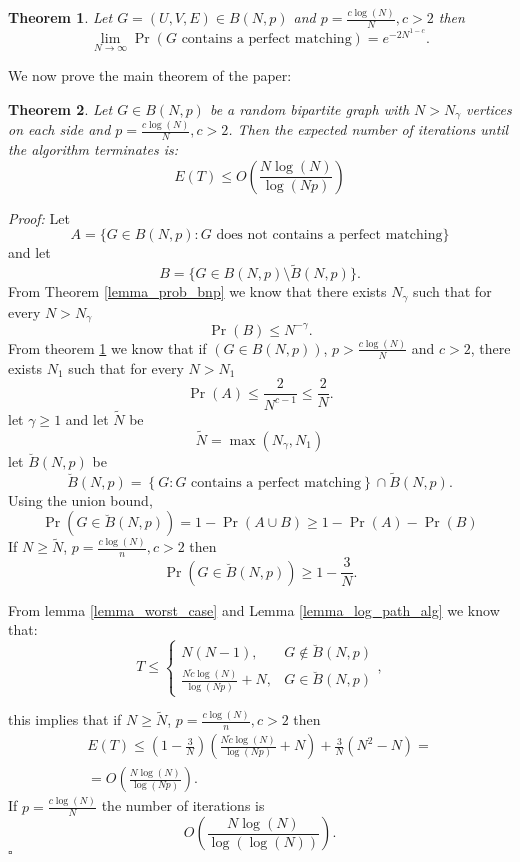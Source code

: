 \documentclass[11pt,onecolumn]{article}
\newcounter{theorem}
\newcommand{\beq}{\begin{equation}}
\newcommand{\eeq}{\end{equation}}
\newcommand{\bea}{\begin{array}}
\newcommand{\ena}{\end{array}}
\newenvironment{proof}{\textit{Proof:}}{\hfill$\square$\\}
\newtheorem{theorem}{Theorem}
\begin{document}
\begin{theorem} \label {theorem_prob_perfect}Let $G=(U,V,E)\in B(N,p)$ and $p=\frac{c\log(N)}{N}, c>2$ then
\beq
\lim_{N\to\infty}\Pr\left(G \textrm{ contains a perfect matching}\right)=e^{-2N^{1-c}}.
\eeq
\end{theorem}
We now prove the main theorem of the paper:
\begin{theorem}\label{theorem_N_iter} Let $G\in B(N,p)$ be a random bipartite graph with $N>N_{\gamma}$ vertices on each side and $p=\frac{c\log(N)}{N},c>2$. Then the expected number of iterations until the algorithm terminates is:
\beq
E(T)\leq O\left(\frac{N\log(N)}{\log(Np)}\right)
\eeq
\end{theorem}
\begin{proof}
Let
\beq
A=\{G\in B(N,p): G \textrm{ does not contains a perfect matching}\}
\eeq
and let
\beq
B=\{G\in B(N,p)\setminus \tilde{B}(N,p)\}.
\eeq
From Theorem \ref{lemma_prob_bnp} we know that there exists $N_{\gamma}$ such that for every $N>N_{\gamma}$
\beq
\Pr\left(B\right)\leq N^{-\gamma}.
\eeq
From theorem \ref{theorem_prob_perfect} we know that if $\left(G\in B(N,p)\right)$, $p>\frac{c\log(N)}{N}$ and $c>2$, there exists $N_1$ such that for every $N>N_1$
\beq
\Pr\left(A\right)\leq \frac{2}{N^{c-1}}\leq \frac{2}{N}.
\eeq
let $\gamma\geq 1$ and let $\tilde{N}$ be
\beq
\tilde{N}=\max(N_{\gamma},N_1)
\eeq
let $\breve{B}(N,p)$  be
\beq
\displaystyle \breve{B}(N,p)=\left\{G:G \textrm{ contains a perfect matching}\right\}\cap\tilde{B}(N,p).
\eeq
Using the union bound,
\beq
\displaystyle \Pr\left(G\in \breve{B}(N,p)\right)=1-\Pr\left(A\cup B\right)\geq 1-\Pr(A)-\Pr(B)
\eeq
If $N\geq\tilde{N}$, $p=\frac{c\log(N)}{n},c>2$ then
\beq
\Pr\left(G\in \breve{B}(N,p)\right)\geq 1-\frac{3}{N}.
\eeq

From lemma \ref{lemma_worst_case} and Lemma \ref{lemma_log_path_alg} we know that:
\beq
T\leq \left\{\begin{matrix} N(N-1),
& G\not\in \breve{B}(N,p)  \\
\frac{N\tilde {c}\log(N)}{\log(Np)}+N,
 & G\in \breve{B}(N,p)
\end{matrix}\right. ,
\eeq

this implies that if $N\geq\tilde{N}$, $p=\frac{c\log(N)}{n},c>2$ then
\beq
\bea{l}
\displaystyle E\left(T\right)\leq \left(1-\frac{3}{N}\right)\left(\frac{N\tilde {c}\log(N)}{\log(Np)}+N\right)+\frac{3}{N}(N^2-N)=\\
\displaystyle = O\left(\frac{N\log(N)}{\log(Np)}\right).
\ena
\eeq
If $p=\frac{c\log(N)}{N}$ the number of iterations is
\beq
O\left(\frac{N\log(N)}{\log(\log(N))}\right).
\eeq
\end{proof}
\end{document}
